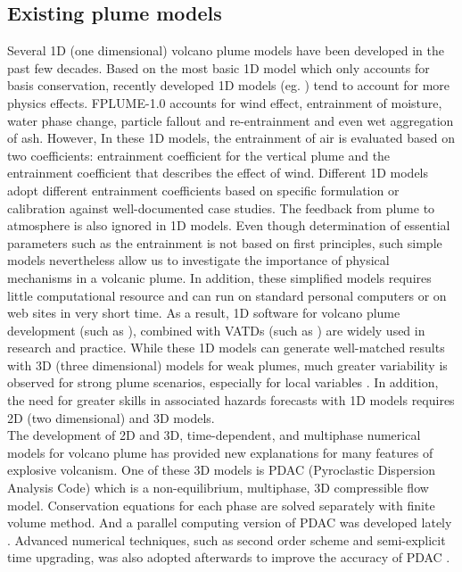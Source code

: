 \documentclass[journal abbreviation, manuscript]{copernicus}
\begin{document}
\subsection{Existing plume models}
Several 1D (one dimensional) volcano plume models have been developed in the past few decades. Based on the most basic 1D model \citep{woods1988fluid} which only accounts for basis conservation, recently developed 1D models (eg. \citep{bursik2001effect, mastin2007user, degruyter2012improving, woodhouse2013interaction, devenish2013using, de2015plume, folch2016fplume, pouget2016sensitivity}) tend to account for more physics effects. FPLUME-1.0 \citep{folch2016fplume} accounts for wind effect, entrainment of moisture, water phase change, particle fallout and re-entrainment and even wet aggregation of ash. However, In these 1D models, the entrainment of air is evaluated based on two coefficients: entrainment coefficient for the vertical plume and the entrainment coefficient that describes the effect of wind. Different 1D models adopt different entrainment coefficients based on specific formulation or calibration against well-documented case studies. The feedback from plume to atmosphere is also ignored in 1D models. Even though determination of essential parameters such as the entrainment is not based on first principles, such simple models nevertheless allow us to investigate the importance of physical mechanisms in a volcanic plume. In addition, these simplified models requires little computational resource and can run on standard personal computers or on web sites in very short time. As a result, 1D software for volcano plume development (such as \citep{267, 1194, 3541}), combined with VATDs (such as \citep{114, draxler2015hysplit}) are widely used in research and practice. While these 1D models can generate well-matched results with 3D (three dimensional) models for weak plumes, much greater variability is observed for strong plume scenarios, especially for local variables \citep{costa2016results}. In addition, the need for greater skills in associated hazards forecasts with 1D models requires 2D (two dimensional) and 3D models.\\
The development of 2D and 3D, time-dependent, and multiphase numerical models for volcano plume has provided new explanations for many features of explosive volcanism. One of these 3D models is PDAC (Pyroclastic Dispersion Analysis Code) \citep{neri2003multiparticle}  which is a non-equilibrium, multiphase, 3D compressible flow model. Conservation equations for each phase are solved separately with finite volume method. And a parallel computing version of PDAC was developed lately \citep{ongaro2007parallel}. Advanced numerical techniques, such as second order scheme and semi-explicit time upgrading, was also adopted afterwards to improve the accuracy of PDAC \citep{carcano2013semi}. 
\end{document}

